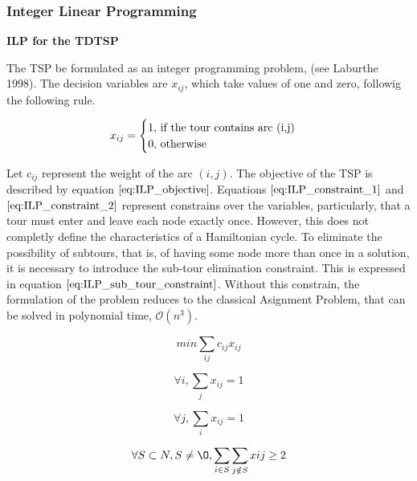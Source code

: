 \subsubsection{Integer Linear Programming}
\label{sec:TDTSP_ILP}

\textbf{ILP for the TDTSP}

The TSP be formulated as an integer programming problem, (see Laburthe 1998). The decision variables are
$x_{ij}$, which take values of one and zero, followig the following rule.

\begin{equation}
\label{eq:bynary_x}
\mathcal{}
x_{ij} =
\begin{cases}
1, $    if the tour contains arc (i,j)$\\
0, $    otherwise$
\end{cases}
\end{equation}

Let $c_{ij}$ represent the weight of the arc $(i,j)$. The objective of the TSP is described by equation $\ref{eq:ILP_objective}$. Equations $\ref{eq:ILP_constraint_1}$ and $\ref{eq:ILP_constraint_2}$ represent constrains over the variables, particularly, that a tour must enter and leave each node exactly once. However, this does not completly define the characteristics of a Hamiltonian cycle. To eliminate the possibility of subtours, that is, of having some node more than once in a solution, it is necessary to introduce the sub-tour elimination constraint. This is expressed in equation $\ref{eq:ILP_sub_tour_constraint}$. Without this constrain, the formulation of the problem reduces to the classical Asignment Problem, that can be solved in polynomial time, $\mathcal{O}(n^{3})$.

\begin{equation}
	\label{eq:ILP_objective}
	min \sum_{ij}c_{ij}x_{ij}
\end{equation}

\begin{equation}
	\label{eq:ILP_constraint_1}
	\forall i, \sum_{j} x_{ij} = 1
\end{equation}

\begin{equation}
	\label{eq:ILP_constraint_2}
	\forall j, \sum_{i} x_{ij} = 1
\end{equation}

\begin{equation}
\label{eq:ILP_sub_tour_constraint}
\forall S \subset N, S \ne \O, \sum_{i \in S} \sum_{j \notin S} xij \geq 2
\end{equation}





